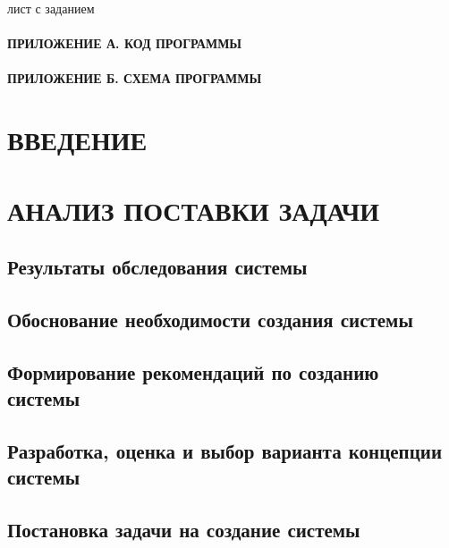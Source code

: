 \documentclass[12pt, a4paper, simple]{eskdtext}
\begin{document}
    

    лист с заданием
    \newpage
    
    \tableofcontents
    \paragraph{ПРИЛОЖЕНИЕ А. КОД ПРОГРАММЫ}
    \paragraph{ПРИЛОЖЕНИЕ Б. СХЕМА ПРОГРАММЫ}
    \newpage

    \section*{ВВЕДЕНИЕ}

    \newpage

    \section{АНАЛИЗ ПОСТАВКИ ЗАДАЧИ}
    \subsection{Результаты обследования системы}

    \newpage
    
    \subsection{Обоснование необходимости создания системы}

    \newpage

    \subsection{Формирование рекомендаций по созданию системы}

    \newpage

    \subsection{Разработка, оценка и выбор варианта концепции системы}

    \newpage

    \subsection{Постановка задачи на создание системы}
\end{document}
